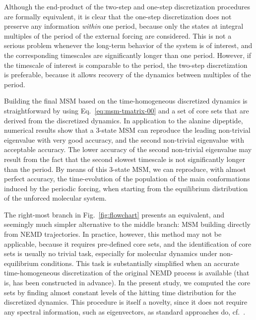 \documentclass[journal=jctcce,manuscript=article]{achemso}
\begin{document}
Although the end-product of the two-step and one-step discretization procedures are formally equivalent,
it is clear that the one-step discretization does not preserve any information
\emph{within} one period, because only the states
at integral multiples of the period of the external forcing are considered. This is not a serious problem
whenever the long-term behavior of the system is of interest, and
the corresponding timescales are significantly longer than one
period. However, if the timescale of interest 
is comparable to the period, the two-step
discretization is preferable, because it allows recovery of the dynamics between multiples of
the period. 

Building the final MSM based on the time-homogeneous discretized dynamics is straightforward by
using Eq.~\eqref{eq:msm-tmatrix-00} and a set of core sets that are
derived from the discretized dynamics.  In application to the alanine dipeptide, numerical
results show that a 3-state MSM can reproduce the leading non-trivial
eigenvalue with very good accuracy, and the second non-trivial
eigenvalue with acceptable accuracy. The lower accuracy of the
second non-trivial eigenvalue may result from the fact that the second
slowest timescale is not significantly longer than the period. By means of
this 3-state MSM, we can reproduce, with almost perfect
accuracy, the time-evolution of the population of the main conformations induced by the periodic forcing, when starting from the  
equilibrium distribution of the unforced molecular system.


The right-most branch in Fig.~\ref{fig:flowchart} presents an
equivalent, and seemingly
much simpler alternative to the middle branch: MSM building directly from NEMD trajectories.
In practice, however, this method may not be applicable, because
it requires pre-defined core sets, and the identification of core sets is 
usually  no trivial task, especially for molecular dynamics under non-equilibrium conditions.
This task is substantially simplified when an accurate time-homogeneous discretization 
of the original NEMD process is available (that is, has been constructed in advance).
In the present study, we computed the core sets by
finding almost constant levels of the hitting time distribution for the discretized dynamics. 
This procedure is itself a novelty, since it does not require any spectral information, such as eigenvectors, as standard approaches do, cf.~\cite{prinz2011markov,A19-1}.

\end{document}
